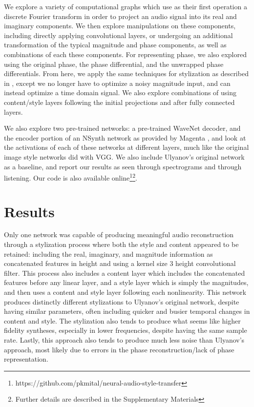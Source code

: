 \documentclass{article}
\begin{document}
We explore a variety of computational graphs which use as their first operation a discrete Fourier transform in order to project an audio signal into its real and imaginary components.  We then explore manipulations on these components, including directly applying convolutional layers, or undergoing an additional transformation of the typical magnitude and phase components, as well as combinations of each these components.  For representing phase, we also explored using the original phase, the phase differential, and the unwrapped phase differentials.  From here, we apply the same techniques for stylization as described in \cite{Ulyanov2016}, except we no longer have to optimize a noisy magnitude input, and can instead optimize a time domain signal.  We also explore combinations of using content/style layers following the initial projections and after fully connected layers.

We also explore two pre-trained networks: a pre-trained WaveNet decoder, and the encoder portion of an NSynth network as provided by Magenta \cite{Engel2017}, and look at the activations of each of these networks at different layers, much like the original image style networks did with VGG.  We also include Ulyanov's original network as a baseline, and report our results as seen through spectrograms and through listening.  Our code is also available online\footnote{https://github.com/pkmital/neural-audio-style-transfer}\footnote{Further details are described in the Supplementary Materials}.

\section{Results}

Only one network was capable of producing meaningful audio reconstruction through a stylization process where both the style and content appeared to be retained: including the real, imaginary, and magnitude information as concatenated features in height and using a kernel size 3 height convolutional filter.  This process also includes a content layer which includes the concatenated features before any linear layer, and a style layer which is simply the magnitudes, and then uses a content and style layer following each nonlinearity.  This network produces distinctly different stylizations to Ulyanov's original network, despite having similar parameters, often including quicker and busier temporal changes in content and style.  The stylization also tends to produce what seems like higher fidelity syntheses, especially in lower frequencies, despite having the same sample rate.  Lastly, this approach also tends to produce much less noise than Ulyanov's approach, most likely due to errors in the phase reconstruction/lack of phase representation.
\end{document}
